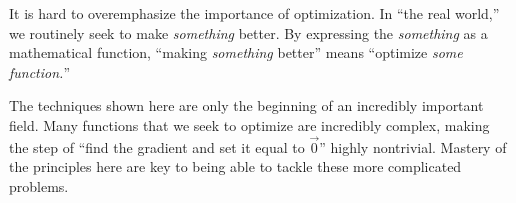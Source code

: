 It is hard to overemphasize the importance of optimization. In ``the real world,'' we routinely seek to make \textit{something} better. By expressing the \textit{something} as a mathematical function, ``making \textit{something} better'' means ``optimize \textit{some function.}'' 

The techniques shown here are only the beginning of an incredibly important field. Many functions that we seek to optimize are incredibly complex, making the step of ``find the gradient and set it equal to $\vec 0$'' highly nontrivial. Mastery of the principles here are key to being able to tackle these more complicated problems.

